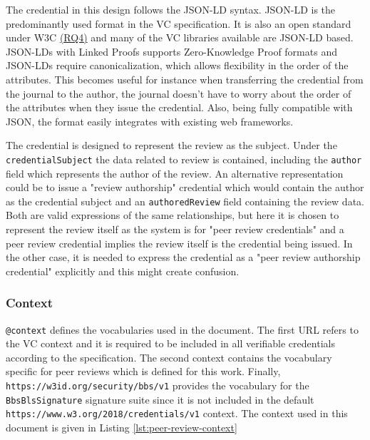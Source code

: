 The credential in this design follows the \acrshort{JSON-LD} syntax. \acrshort{JSON-LD} is the predominantly used format in the \acrshort{VC} specification. It is also an open standard under W3C \parencite{jsonld} \hyperref[rq:open-standards]{(RQ4)} and many of the \acrshort{VC} libraries available are \acrshort{JSON-LD} based.  \acrshort{JSON-LD}s with Linked Proofs supports Zero-Knowledge Proof formats and \acrshort{JSON-LD}s require canonicalization, which allows flexibility in the order of the attributes. This becomes useful for instance when transferring the credential from the journal to the author, the journal doesn't have to worry about the order of the attributes when they issue the credential. Also, being fully compatible with \acrshort{JSON}, the format easily integrates with existing web frameworks. 

The credential is designed to represent the review as the subject. Under the \lstinline{credentialSubject} the data related to review is contained, including the \lstinline{author} field which represents the author of the review. An alternative representation could be to issue a "review authorship" credential which would contain the author as the credential subject and an \lstinline{authoredReview} field containing the review data. Both are valid expressions of the same relationships, but here it is chosen to represent the review itself as the system is for "peer review credentials" and a peer review credential implies the review itself is the credential being issued. In the other case, it is needed to express the credential as a "peer review authorship credential" explicitly and this might create confusion.

\subsubsection{Context}

\lstinline{@context} defines the vocabularies used in the document. The first \acrshort{URL} refers to the \acrshort{VC} context and it is required to be included in all verifiable credentials according to the specification. The second context contains the vocabulary specific for peer reviews which is defined for this work. Finally, \lstinline{https://w3id.org/security/bbs/v1} provides the vocabulary for the \lstinline{BbsBlsSignature} signature suite since it is not included in the default \lstinline{https://www.w3.org/2018/credentials/v1} context. The context used in this document is given in Listing \ref{lst:peer-review-context}

